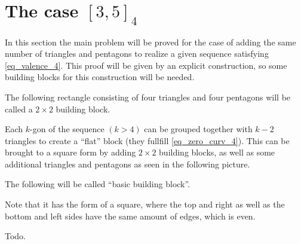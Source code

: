 \section{The case $[3, 5]_4$}
In this section the main problem will be proved for the case of adding the same number of triangles and pentagons to realize a given sequence satisfying \ref{eq_valence_4}. This proof will be given by an explicit construction, so some building blocks for this construction will be needed.
\begin{definition}
  The following rectangle consisting of four triangles and four pentagons will be called a $2 \times 2$ building block.
  \begin{figure}[htpp]
    \centering
  \end{figure}
\end{definition}

Each $k$-gon of the sequence $(k > 4)$ can be grouped together with $k-2$ triangles to create a ``flat'' block (they fullfill \ref{eq_zero_curv_4}). This can be brought to a square form by adding $2 \times 2$ building blocks, as well as some additional triangles and pentagons as seen in the following picture.
\begin{definition} The following will be called ``basic building block''.
  \begin{figure}[htpp]
    \centering
  \end{figure}
  Note that it has the form of a square, where the top and right as well as the bottom and left sides have the same amount of edges, which is even.
\end{definition}
Todo.

